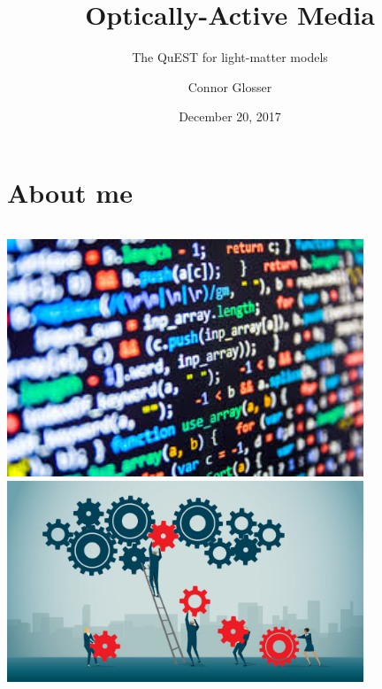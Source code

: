 \documentclass[aspectratio=169]{beamer}
\title{Optically-Active Media}
\subtitle{The QuEST for light-matter models}
\date{December 20, 2017}
\author{Connor Glosser}
\institute{Michigan State University}
\begin{document}
\maketitle

\section{About me}

\begin{frame}
  \vspace{0.7cm}
  \begin{columns}[c]
      \hfill \includegraphics[width=0.8\textwidth]{figures/coding.jpg} \\ \vspace{0.6cm}
      \hfill \includegraphics[width=0.8\textwidth]{figures/collaboration.jpg}


\end{columns}
\end{frame}
\end{document}
